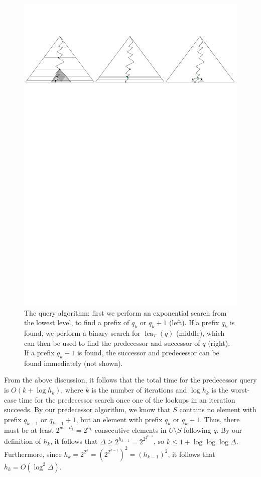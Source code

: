 \documentclass[a4paper,11pt]{article}
\newcommand{\?}{\mskip1.5mu}
\DeclareMathOperator{\lca}{lca} %
\begin{document}
\begin{figure}
\centering
\includegraphics[scale=0.5]{query}
\caption{The query algorithm: first we perform an
exponential search from the lowest level, to find a prefix
of $q_k$  or $q_k+1$ (left). If a prefix $q_{k}$ is found,
we perform a binary search for $\lca_T(q)$ (middle), which can then
be used to find the predecessor and successor of $q$ (right). If
a prefix $q_k+1$ is found, the successor and predecessor 
can be found immediately (not shown).}
\label{fig:query}
\end{figure}

From the above discussion, it follows that
the total time for the predecessor
query is $O(k + \log h_k)$, where $k$ is the number of 
iterations and $\log h_k$ is the worst-case time 
for the predecessor search once one of the lookups 
in an iteration succeeds. 
By our predecessor algorithm, we know that $S$ contains no element with
prefix $q_{k-1}$ or $q_{k-1} + 1$, but an element with
prefix $q_k$ or $q_k + 1$. Thus, there must be
at least $2^{w - d_k} = 2^{h_k}$ consecutive elements in 
$U\setminus S$ following $q$. By our definition of $h_k$, it follows that
$\Delta \geq 2^{h_{k-1}} = 2^{2^{2^{k-1}}}$, so 
$k \leq 1 + \log\log\log \Delta$.
Furthermore, since $h_k = 2^{2^k} = \left(2^{2^{k-1}}\right)^2 
=  (h_{k-1})^2$, 
it follows that $h_k = O(\log^{2} \Delta)$.
\end{document}
